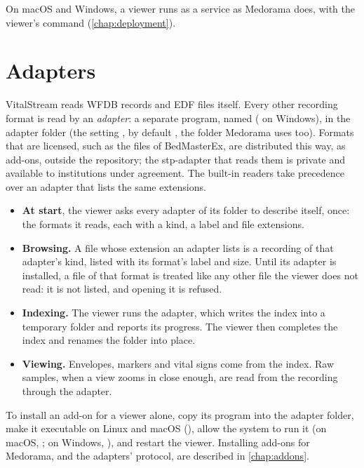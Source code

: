 On macOS and Windows, a viewer runs as a service as Medorama does, with the viewer's command
(\cref{chap:deployment}).

\section{Adapters}
\label{sec:vitalstream-adapters}

VitalStream reads WFDB records and EDF files itself. Every other recording format is read by an
\emph{adapter}: a separate program, named  ( on
Windows), in the adapter folder (the setting , by default
, the folder Medorama uses too). Formats that are
licensed, such as the  files of BedMasterEx, are distributed this way, as add-ons,
outside the repository; the stp-adapter that reads them is private and available to institutions
under agreement. The built-in readers take precedence over an adapter that lists the same
extensions.

\begin{itemize}
\item \textbf{At start}, the viewer asks every adapter of its folder to describe itself, once:
  the formats it reads, each with a kind, a label and file extensions.
\item \textbf{Browsing.} A file whose extension an adapter lists is a recording of that adapter's
  kind, listed with its format's label and size. Until its adapter is installed, a file of that
  format is treated like any other file the viewer does not read: it is not listed, and opening
  it is refused.
\item \textbf{Indexing.} The viewer runs the adapter, which writes the index into a temporary
  folder and reports its progress. The viewer then completes the index and renames the folder
  into place.
\item \textbf{Viewing.} Envelopes, markers and vital signs come from the index. Raw samples, when
  a view zooms in close enough, are read from the recording through the adapter.
\end{itemize}

To install an add-on for a viewer alone, copy its program into the adapter folder, make it
executable on Linux and macOS (), allow the system to run it (on macOS,
; on Windows, ), and restart
the viewer. Installing add-ons for Medorama, and the adapters' protocol, are described in
\cref{chap:addons}.

